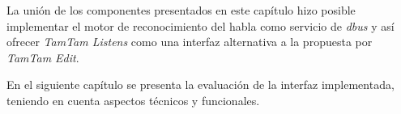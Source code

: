 La uni\'on de los componentes presentados en este cap\'itulo hizo posible implementar el motor 
de reconocimiento del habla como servicio de \emph{dbus} y as\'i ofrecer \emph{TamTam Listens} como una interfaz 
alternativa a la propuesta por \emph{TamTam Edit}.

En el siguiente cap\'itulo se presenta la evaluaci\'on de la interfaz implementada, teniendo en cuenta 
aspectos t\'ecnicos y funcionales.
